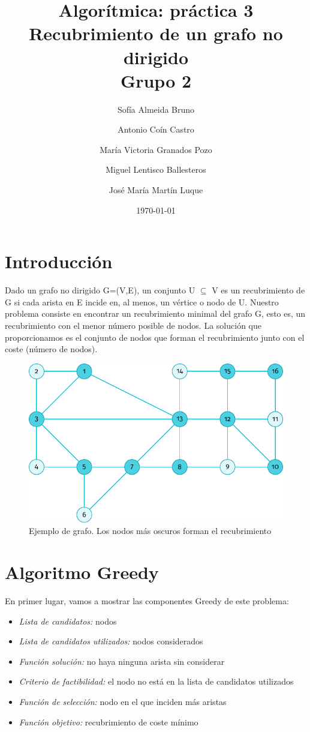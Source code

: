 \documentclass[11pt]{article}
\title{Algorítmica: práctica 3 \\ \large Recubrimiento de un grafo no dirigido\\ \vspace{0.2em}Grupo 2}
\author{Sofía Almeida Bruno \and Antonio Coín Castro \and María Victoria Granados Pozo \and Miguel Lentisco Ballesteros \and José María Martín Luque}
\date{\today}
\begin{document}
\maketitle

\newpage

\section*{Introducción}

Dado un grafo no dirigido G=(V,E), un conjunto U $\subseteq$ V es un recubrimiento de G si cada arista en E incide en, al menos, un vértice o nodo de U. Nuestro problema consiste en encontrar un recubrimiento minimal del grafo G, esto es, un recubrimiento con el menor número posible de nodos. La solución que proporcionamos es el conjunto de nodos que forman el recubrimiento junto con el coste (número de nodos). 

\begin{figure}[H]
	\caption{Ejemplo de grafo. Los nodos más oscuros forman el recubrimiento}
	\centering \includegraphics{./img/grafo.pdf}
\end{figure}

\section*{Algoritmo Greedy}

En primer lugar, vamos a mostrar las componentes Greedy de este problema:

\begin{itemize}
	\item \textit{Lista de candidatos:} nodos
	\item \textit{Lista de candidatos utilizados:} nodos considerados
	\item \textit{Función solución:} no haya ninguna arista sin considerar
	\item \textit{Criterio de factibilidad:} el nodo no está en la lista de candidatos utilizados
	\item \textit{Función de selección:} nodo en el que inciden más aristas
	\item \textit{Función objetivo:} recubrimiento de coste mínimo
\end{itemize}
\end{document}
